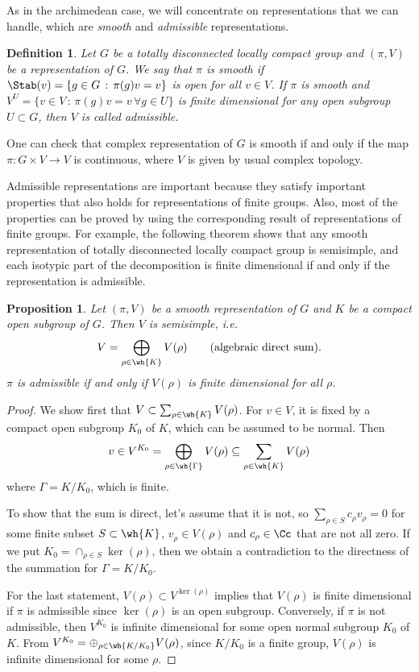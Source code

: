 \documentclass{article}
\newtheorem{definition}{Definition}[section]
\newtheorem{proposition}{Proposition}[section]
\begin{document}
As in the archimedean case, we will concentrate on representations that  we can handle, which are \emph{smooth} and \emph{admissible} representations. 
\begin{definition}
Let $G$ be a totally disconnected locally compact group and $(\pi, V)$ be a representation of $G$. We say that $\pi$ is \emph{smooth} if $\Stab(v) = \{g\in G\,:\,\pi(g)v= v\}$ is open for all $v\in V$. 
If $\pi$ is smooth and $V^{U} = \{v\in V\,:\, \pi(g)v= v\,\forall g\in U\}$ is finite dimensional for any open subgroup $U\subset G$, then $V$ is called \emph{admissible}.
\end{definition} 
 One can check that complex representation of $G$ is smooth if and only if the map $\pi:G\times V\to V$ is continuous, where $V$ is given by usual complex topology. 


Admissible representations are important because they satisfy important properties that also holds for representations of finite groups. Also, most of the properties can be proved by using the corresponding result of representations of finite groups. 
For example, the following theorem shows that any smooth representation of totally disconnected locally compact group is semisimple, and each isotypic part of the decomposition is finite dimensional if and only if the representation is admissible. 
\begin{proposition}
Let $(\pi, V)$ be a smooth representation of $G$ and $K$ be a compact open subgroup of $G$. Then $V$ is semisimple, i.e.
$$
V = \bigoplus_{\rho\in \wh{K}} V(\rho)\qquad(\text{algebraic direct sum}).
$$
$\pi$ is admissible if and only if $V(\rho)$ is finite dimensional for all $\rho$. 
\end{proposition}
\begin{proof}
We show first that $V\subset \sum_{\rho\in \wh{K}} V(\rho)$. 
For $v\in V$, it is fixed by a compact open subgroup $K_{0}$ of $K$, which can be assumed to be normal. Then 
$$
v\in V^{K_{0}} = \bigoplus_{\rho\in \wh{\Gamma}} V(\rho) \subseteq \sum_{\rho\in \wh{K}} V(\rho)
$$
where $\Gamma = K/K_{0}$, which is finite. 

To show that the sum is direct, let's assume that it is not, so $\sum_{\rho\in S} c_{\rho}v_{\rho} = 0$ for some finite subset $S\subset \wh{K}$, $v_{\rho}\in V(\rho)$ and $c_{\rho}\in \Cc$ that are not all zero. If we put $K_{0} = \cap_{\rho\in S}\ker (\rho)$, then we obtain a contradiction to the directness of the summation for $\Gamma = K/K_{0}$. 

For the last statement, $V(\rho)\subset V^{\ker(\rho)}$ implies that $V(\rho)$ is finite dimensional if $\pi$ is admissible since $\ker(\rho)$ is an open subgroup. 
Conversely, if $\pi$ is not admissible, then $V^{K_{0}}$ is infinite dimensional for some open normal subgroup $K_{0}$ of $K$. From $V^{K_{0}} = \oplus_{\rho\in \wh{K/K_{0}}} V(\rho)$, since $K/K_{0}$ is a finite group, $V(\rho)$ is infinite dimensional for some $\rho$. 
\end{proof}
\end{document}
